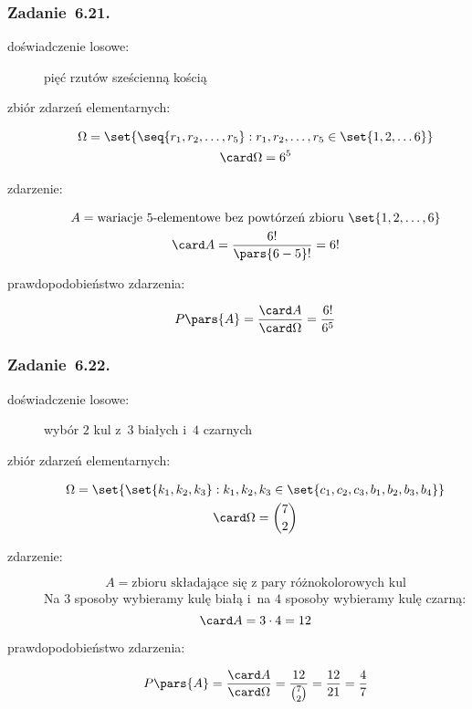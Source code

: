 \subsubsection*{Zadanie~6.21.}
\begin{description}
    \item[doświadczenie losowe:] pięć rzutów sześcienną kością
    \item[zbiór zdarzeń elementarnych:]
        \begin{gather*}
            \Omega = \set{\seq{r_1, r_2, \ldots, r_5} : r_1, r_2, \ldots, r_5 \in \set{1, 2, \ldots 6}}\\
            \card\Omega = 6^5
        \end{gather*}
    \item[zdarzenie:]
        \begin{gather*}
            A = \text{wariacje \(5\)-elementowe bez powtórzeń zbioru \(\set{1, 2, \ldots, 6}\)}\\
            \card A = \frac{6!}{\pars{6 - 5}!} = 6!
        \end{gather*}
    \item[prawdopodobieństwo zdarzenia:]
        \begin{equation*}
            P\pars{A}
                = \frac{\card A}{\card\Omega}
                = \frac{6!}{6^5}
        \end{equation*}
\end{description}
\subsubsection*{Zadanie~6.22.}
\begin{description}
    \item[doświadczenie losowe:] wybór \(2\) kul z~\(3\) białych i~\(4\) czarnych
    \item[zbiór zdarzeń elementarnych:]
        \begin{gather*}
            \Omega = \set{\set{k_1, k_2, k_3} : k_1, k_2, k_3 \in \set{c_1, c_2, c_3, b_1, b_2, b_3, b_4}}\\
            \card\Omega = \binom{7}{2}
        \end{gather*}
    \item[zdarzenie:]
        \begin{equation*}
            A = \text{zbioru składające się z~pary różnokolorowych kul}
        \end{equation*}
        Na \(3\) sposoby wybieramy kulę białą i~na \(4\) sposoby wybieramy kulę czarną:
        \begin{equation*}
            \card A = 3 \cdot 4 = 12
        \end{equation*}
    \item[prawdopodobieństwo zdarzenia:]
        \begin{equation*}
            P\pars{A}
                = \frac{\card A}{\card\Omega}
                = \frac{12}{\binom{7}{2}}
                = \frac{12}{21}
                = \frac{4}{7}
        \end{equation*}
\end{description}
